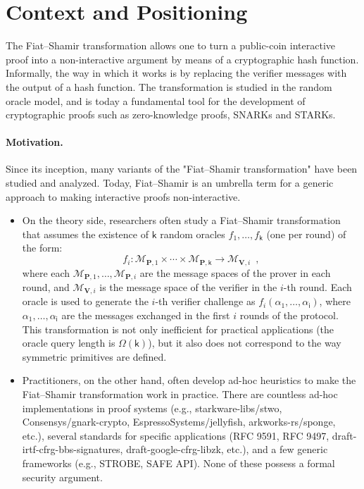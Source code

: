 \documentclass{article}
\begin{document}
\clearpage
\section{Context and Positioning}


The Fiat--Shamir transformation allows one to turn a public-coin interactive proof into a non-interactive argument by means of a cryptographic hash function.
Informally, the way in which it works is by replacing the verifier messages with the output of a hash function. The transformation is studied in the random oracle model, and is today a fundamental tool for the development of cryptographic proofs such as zero-knowledge proofs, SNARKs and STARKs.

\paragraph{Motivation.}
Since its inception, many variants of the "Fiat--Shamir transformation" have been studied and analyzed. Today, Fiat--Shamir is an umbrella term for a generic approach to making interactive proofs non-interactive.
\begin{itemize}
    \item On the theory side, researchers often study a Fiat--Shamir transformation that assumes the existence of $\mathsf{k}$ random oracles $f_1, \dots, f_{\mathsf{k}}$ (one per round) of the form:
\begin{equation*}
    f_i: \mathcal{M}_{\mathbf{P}, 1} \times \cdots \times \mathcal{M}_{\mathbf{P}, \mathsf{k}} \to \mathcal{M}_{\mathbf{V}, i}\enspace,
\end{equation*}
where each \( \mathcal{M}_{\mathbf{P}, 1}, \dots, \mathcal{M}_{\mathbf{P}, i} \) are the message spaces of the prover in each round, and \( \mathcal{M}_{\mathbf{V}, i} \) is the message space of the verifier in the \(i\)-th round.
Each oracle is used to generate the \(i\)-th verifier challenge as \(f_i(\alpha_1, \dots, \alpha_{\mathsf{i}})\), where \(\alpha_1, \dots, \alpha_{\mathsf{i}}\) are the messages exchanged in the first \(i\) rounds of the protocol.
This transformation is not only inefficient for practical applications (the oracle query length is $\Omega(\mathsf{k})$), but it also does not correspond to the way symmetric primitives are defined.

    \item Practitioners, on the other hand, often develop ad-hoc heuristics to make the Fiat--Shamir transformation work in practice. There are countless ad-hoc implementations in proof systems (e.g., starkware-libs/stwo, Consensys/gnark-crypto, EspressoSystems/jellyfish, arkworks-rs/sponge, etc.), several standards for specific applications (RFC 9591, RFC 9497, draft-irtf-cfrg-bbs-signatures, draft-google-cfrg-libzk, etc.), and a few generic frameworks (e.g., STROBE, SAFE API). None of these possess a formal security argument.
\end{itemize}
\end{document}
